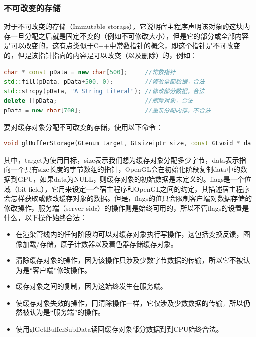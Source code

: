 \subsubsection{不可改变的存储}
对于不可改变的存储（Immutable storage），它说明宿主程序声明该对象的这块内存一旦分配之后就是固定不变的（例如不可修改大小），但是它的部分或全部内容是可以改变的，这有点类似于C++中常数指针的概念，即这个指针是不可改变的，但是该指针指向的内容是可以改变（以及删除）的，例如：

\begin{lstlisting}[language=C++]
char * const pData = new char[500];     //常数指针
std::fill(pData, pData+500, 0);         //修改全部数据，合法
std::strcpy(pData, "A String Literal"); //修改部分数据，合法
delete []pData;                         //删除对象，合法
pData = new char[700];                  //重新分配内存，不合法
\end{lstlisting}

要对缓存对象分配不可改变的存储，使用以下命令：

\begin{lstlisting}[language=C++]
void glBufferStorage​(GLenum target​, GLsizeiptr size​, const GLvoid * data​, GLbitfield flags​);
\end{lstlisting}

其中，target为使用目标，size表示我们想为缓存对象分配多少字节，data表示指向一个具有size长度的字节数组的指针，OpenGL会在初始化阶段复制data中的数据到GPU，如果data为NULL，则缓存对象的初始数据是未定义的。flags是一个位域（bit field），它用来设定一个宿主程序和OpenGL之间的约定，其描述宿主程序会怎样获取或修改缓存对象的数据。但是，flags的值只会限制客户端对数据存储的修改操作，服务端（server-side）的操作则是始终可用的，所以不管flags的设置是什么，以下操作始终合法：

\begin{itemize}
	\item 在渲染管线内的任何阶段均可以对缓存对象执行写操作，这包括变换反馈，图像加载/存储，原子计数器以及着色器存储缓存对象。
	\item 清除缓存对象的操作，因为该操作只涉及少数字节数据的传输，所以它不被认为是“客户端”修改操作。
	\item 缓存对象之间的复制，因为这始终发生在服务端。
	\item 使缓存对象失效的操作，同清除操作一样，它仅涉及少数数据的传输，所以仍然被认为是“服务端”的操作。
	\item 使用glGetBufferSubData读回缓存对象部分数据到到CPU始终合法。
\end{itemize}

